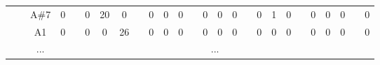 \documentclass[12pt]{article}
\begin{document}
\begin{table}[!ht]
{\begin{tabular}{clcccccccccccccccccccccccc}
									& \multicolumn{1}{l|}{} & \multicolumn{1}{c|}{A\#7} & \multicolumn{1}{c|}{0}    & \multicolumn{1}{c|}{}                     & \multicolumn{1}{c|}{0}    & \multicolumn{1}{c|}{20}   & \multicolumn{1}{c|}{0}  & \multicolumn{1}{c|}{}                     & \multicolumn{1}{c|}{0}  & \multicolumn{1}{c|}{0}  & \multicolumn{1}{c|}{0}  & \multicolumn{1}{c|}{}                     & \multicolumn{1}{c|}{0}    & \multicolumn{1}{c|}{0}    & \multicolumn{1}{c|}{0}    & \multicolumn{1}{c|}{}                     & \multicolumn{1}{c|}{0}  & \multicolumn{1}{c|}{1}  & \multicolumn{1}{c|}{0}    & \multicolumn{1}{c|}{}                     & \multicolumn{1}{c|}{0}    & \multicolumn{1}{c|}{0}    & \multicolumn{1}{c|}{0}  & \multicolumn{1}{c|}{}                     & \multicolumn{1}{c|}{0}  \\ \cline{3-4} \cline{6-8} \cline{10-12} \cline{14-16} \cline{18-20} \cline{22-24} \cline{26-26} 
									& \multicolumn{1}{l|}{} & \multicolumn{1}{c|}{A1}   & \multicolumn{1}{c|}{0}    & \multicolumn{1}{c|}{}                     & \multicolumn{1}{c|}{0}    & \multicolumn{1}{c|}{0}    & \multicolumn{1}{c|}{26} & \multicolumn{1}{c|}{}                     & \multicolumn{1}{c|}{0}  & \multicolumn{1}{c|}{0}  & \multicolumn{1}{c|}{0}  & \multicolumn{1}{c|}{}                     & \multicolumn{1}{c|}{0}    & \multicolumn{1}{c|}{0}    & \multicolumn{1}{c|}{0}    & \multicolumn{1}{c|}{}                     & \multicolumn{1}{c|}{0}  & \multicolumn{1}{c|}{0}  & \multicolumn{1}{c|}{0}    & \multicolumn{1}{c|}{}                     & \multicolumn{1}{c|}{0}    & \multicolumn{1}{c|}{0}    & \multicolumn{1}{c|}{0}  & \multicolumn{1}{c|}{}                     & \multicolumn{1}{c|}{0}  \\ \cline{3-4} \cline{6-8} \cline{10-12} \cline{14-16} \cline{18-20} \cline{22-24} \cline{26-26} 
									& \multicolumn{1}{l|}{} & \multicolumn{1}{c|}{...}  & \multicolumn{23}{c|}{...}                                                                                                                                                                                                                                                                                                                                                                                                                                                                                                                                                                                                                                                                                                                         \\ \cline{3-4} \cline{6-8} \cline{10-12} \cline{14-16} \cline{18-20} \cline{22-24} \cline{26-26} 

\end{tabular}}
\end{table}
\end{document}
